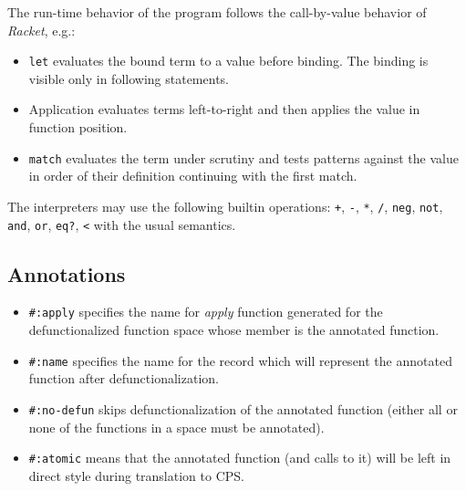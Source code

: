 
The run-time behavior of the program follows the call-by-value behavior of \emph{Racket}, e.g.:
\begin{itemize}
  \item \lstinline!let! evaluates the bound term to a value before binding.
  The binding is visible only in following statements.
  \item Application evaluates terms left-to-right and then applies the value in function position.
  \item \lstinline!match! evaluates the term under scrutiny and tests patterns against the value in order of their definition continuing with the first match.
\end{itemize}
The interpreters may use the following builtin operations: \lstinline!+!, \lstinline!-!, \lstinline!*!, \lstinline!/!, \lstinline!neg!, \lstinline!not!, \lstinline!and!, \lstinline!or!, \lstinline!eq?!, \lstinline!<! with the usual semantics.

\subsection*{Annotations}
\begin{itemize}
  \item \lstinline!#:apply! specifies the name for \emph{apply} function generated for the defunctionalized function space whose member is the annotated function.
  \item \lstinline!#:name! specifies the name for the record which will represent the annotated function after defunctionalization.
  \item \lstinline!#:no-defun! skips defunctionalization of the annotated function (either all or none of the functions in a space must be annotated).
  \item \lstinline!#:atomic! means that the annotated function (and calls to it) will be left in direct style during translation to CPS.
\end{itemize}




